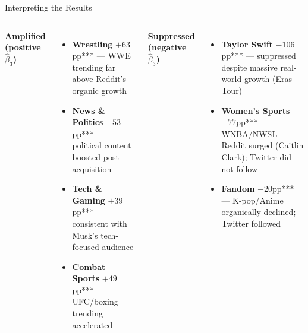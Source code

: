 \documentclass[aspectratio=169]{beamer}
\begin{document}
\begin{frame}{Interpreting the Results}
\begin{columns}[t]
    \textbf{\textcolor{utepblue}{Amplified} (positive $\hat{\beta}_3$)}
    \begin{itemize}
        \item \textbf{Wrestling} $+63$pp*** --- WWE trending far above Reddit's organic growth
        \item \textbf{News \& Politics} $+53$pp*** --- political content boosted post-acquisition
        \item \textbf{Tech \& Gaming} $+39$pp*** --- consistent with Musk's tech-focused audience
        \item \textbf{Combat Sports} $+49$pp*** --- UFC/boxing trending accelerated
    \end{itemize}

    \textbf{\textcolor{red!70!black}{Suppressed} (negative $\hat{\beta}_3$)}
    \begin{itemize}
        \item \textbf{Taylor Swift} $-106$pp*** --- suppressed despite massive real-world growth (Eras Tour)
        \item \textbf{Women's Sports} $-77$pp*** --- WNBA/NWSL Reddit surged (Caitlin Clark); Twitter did not follow
        \item \textbf{Fandom} $-20$pp*** --- K-pop/Anime organically declined; Twitter followed
    \end{itemize}
\end{columns}
\end{frame}
\end{document}
